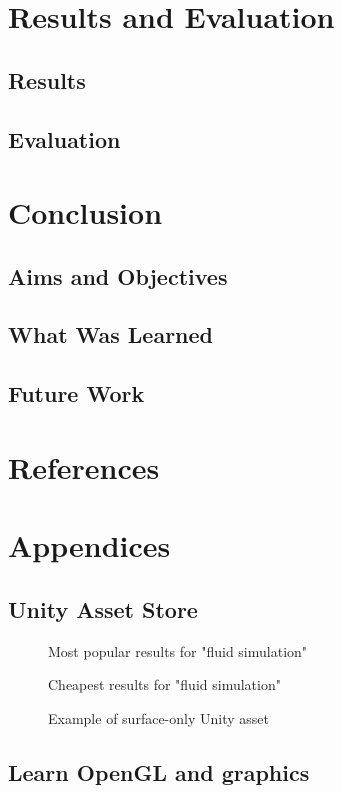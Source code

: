 \documentclass[12pt]{article}
\newcommand{\wideimage}[2][]{%
  \makebox[\textwidth][c]{\texttt{[image: \#2]}}%
}
\begin{document}
    \section{Results and Evaluation}
    \label{sec:resultsandevaluation}
    \subsection{Results}
    \subsection{Evaluation}

    \section{Conclusion}
    \label{sec:conclusion}
    \subsection{Aims and Objectives}
    \subsection{What Was Learned}
    \subsection{Future Work}

    \newpage
    \section{References}
    \label{sec:references}
    

    \newpage
    \section{Appendices}
    \label{sec:appendices}

    \subsection{Unity Asset Store}

    \begin{figure}[H]
        \noindent\wideimage[]{unityStore1.png}
        \caption{Most popular results for "fluid simulation" \cite{unityasset}}
    \end{figure}

    \begin{figure}[H]
        \noindent\wideimage[]{unityStore2.png}
        \caption{Cheapest results for "fluid simulation" \cite{unityasset}}
    \end{figure}

    \begin{figure}[H]
        \noindent\wideimage[]{stylizedWaterURP.png}
        \caption{Example of surface-only Unity asset \cite{stylized}}
    \end{figure}

    \subsection{Learn OpenGL and graphics}
\end{document}
